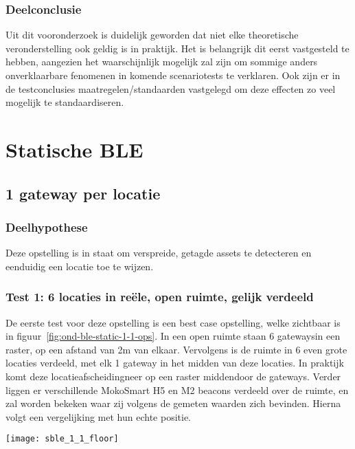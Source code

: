 \subsubsection{Deelconclusie}
Uit dit vooronderzoek is duidelijk geworden dat niet elke theoretische veronderstelling ook geldig is in praktijk. Het is belangrijk dit eerst vastgesteld te hebben, aangezien het waarschijnlijk mogelijk zal zijn om sommige anders onverklaarbare fenomenen in komende scenariotests te verklaren. Ook zijn er in de testconclusies maatregelen/standaarden vastgelegd om deze effecten zo veel mogelijk te standaardiseren.

\section{Statische BLE}
\subsection{1 gateway per locatie}
\label{sec:ond-ble-1}

\subsubsection{Deelhypothese}
Deze opstelling is in staat om verspreide, getagde assets te detecteren en eenduidig een locatie toe te wijzen.

\subsubsection{Test 1: 6 locaties in reële, open ruimte, gelijk verdeeld}
\label{sec:ond-ble-1-1}
\begin{minipage}{0.55\textwidth}
De eerste test voor deze opstelling is een best case opstelling, welke zichtbaar is in figuur~\ref{fig:ond-ble-static-1-1-ops}. In een open ruimte staan 6 gateways\footnotemark in een raster, op een afstand van 2m van elkaar. Vervolgens is de ruimte in 6 even grote locaties verdeeld, met elk 1 gateway in het midden van deze locaties. In praktijk komt deze locatieafscheiding\footnotemark neer op een raster middendoor de gateways. Verder liggen er verschillende MokoSmart H5 en M2 beacons verdeeld over de ruimte\footnotemark, en zal worden bekeken waar zij volgens de gemeten waarden zich bevinden. Hierna volgt een vergelijking met hun echte positie.
\end{minipage}
\hfill
\begin{minipage}{0.42\textwidth}
	\texttt{[image: sble\_1\_1\_floor]}
	\label{fig:ond-ble-static-1-1-ops}
\end{minipage}

